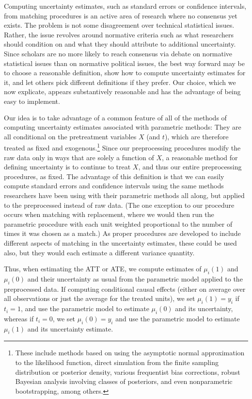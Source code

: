 \documentclass[11pt,titlepage]{article}
\begin{document}
Computing uncertainty estimates, such as standard errors or confidence
intervals, from matching procedures is an active area of research
where no consensus yet exists.  The problem is not some disagreement
over technical statistical issues.  Rather, the issue revolves around
normative criteria such as what researchers should condition on and
what they should attribute to additional uncertainty.  Since scholars
are no more likely to reach consensus via debate on normative
statistical issues than on normative political issues, the best way
forward may be to choose a reasonable definition, show how to compute
uncertainty estimates for it, and let others pick different
definitions if they prefer.  Our choice, which we now explicate,
appears substantively reasonable and has the advantage of being easy
to implement.

Our idea is to take advantage of a common feature of all of the
methods of computing uncertainty estimates associated with parametric
methods: They are all conditional on the pretreatment variables $X$
(and $t$), which are therefore treated as fixed and
exogenous.\footnote{These include methods based on using the
  asymptotic normal approximation to the likelihood function, direct
  simulation from the finite sampling distribution or posterior
  density, various frequentist bias corrections, robust Bayesian
  analysis involving classes of posteriors, and even nonparametric
  bootstrapping, among others.}  Since our preprocessing procedures
modify the raw data only in ways that are solely a function of $X$, a
reasonable method for defining uncertainty is to continue to treat
$X$, and thus our entire preprocessing procedures, as fixed.  The
advantage of this definition is that we can easily compute standard
errors and confidence intervals using the same methods researchers
have been using with their parametric methods all along, but applied
to the preprocessed instead of raw data.  (The one exception to our
procedure occurs when matching with replacement, where we would then
run the parametric procedure with each unit weighted proportional to
the number of times it was chosen as a match.)  As proper procedures
are developed to include different aspects of matching in the
uncertainty estimates, these could be used also, but they would each
estimate a different variance quantity.

Thus, when estimating the ATT or ATE, we compute estimates of
$\mu_i(1)$ and $\mu_i(0)$ and their uncertainty as usual from the
parametric model applied to the preprocessed data.  If computing
conditional causal effects (either on average over all observations or
just the average for the treated units), we set $\mu_i(1)=y_i$ if
$t_i=1$, and use the parametric model to estimate $\mu_i(0)$ and its
uncertainty, whereas if $t_i=0$, we set $\mu_i(0)=y_i$ and use the
parametric model to estimate $\mu_i(1)$ and its uncertainty estimate.
\end{document}
